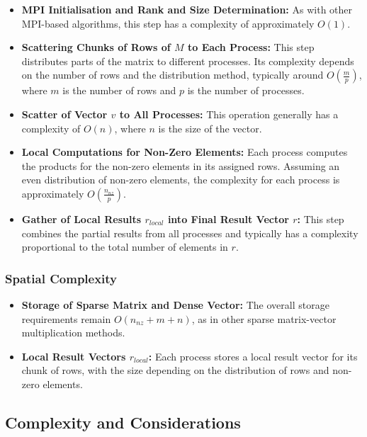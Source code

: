 \documentclass[12pt,oneside]{book} %
\begin{document}
\begin{itemize}
    \item \textbf{MPI Initialisation and Rank and Size Determination:} As with other MPI-based algorithms, this step has a complexity of approximately \( O(1) \).

    \item \textbf{Scattering Chunks of Rows of \( M \) to Each Process:} This step distributes parts of the matrix to different processes. Its complexity depends on the number of rows and the distribution method, typically around \( O(\frac{m}{p}) \), where \( m \) is the number of rows and \( p \) is the number of processes.

    \item \textbf{Scatter of Vector \( v \) to All Processes:} This operation generally has a complexity of \( O(n) \), where \( n \) is the size of the vector.

    \item \textbf{Local Computations for Non-Zero Elements:} Each process computes the products for the non-zero elements in its assigned rows. Assuming an even distribution of non-zero elements, the complexity for each process is approximately \( O(\frac{n_{nz}}{p}) \).

    \item \textbf{Gather of Local Results \( r_{local} \) into Final Result Vector \( r \):} This step combines the partial results from all processes and typically has a complexity proportional to the total number of elements in \( r \).
\end{itemize}

\subsubsection{Spatial Complexity}

\begin{itemize}
    \item \textbf{Storage of Sparse Matrix and Dense Vector:} The overall storage requirements remain \( O(n_{nz} + m + n) \), as in other sparse matrix-vector multiplication methods.

    \item \textbf{Local Result Vectors \( r_{local} \):} Each process stores a local result vector for its chunk of rows, with the size depending on the distribution of rows and non-zero elements.
\end{itemize}

\subsection*{Complexity and Considerations}
\end{document}
